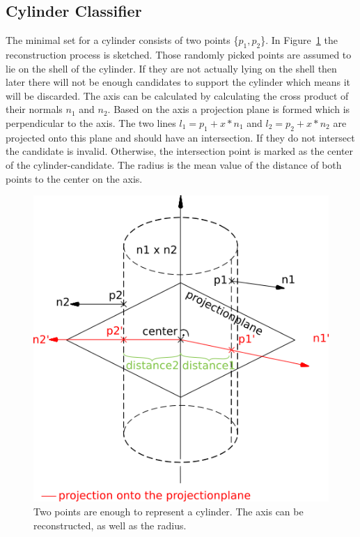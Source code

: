 \documentclass[../ClassicThesis.tex]{subfiles}
\begin{document}
\subsection{Cylinder Classifier}
The minimal set for a cylinder consists of two points \{$p_1, p_2$\}. In Figure~\ref{fig:cylinder} the reconstruction process is sketched. Those randomly picked points are assumed to lie on the shell of the cylinder. If they are not actually lying on the shell then later there will not be enough candidates to support the cylinder which means it will be discarded. The axis can be calculated by calculating the cross product of their normals $n_1$ and $n_2$. Based on the axis a projection plane is formed which is perpendicular to the axis. The two lines $l_1 = p_1 + x*n_1$ and $l_2 = p_2 + x*n_2$ are projected onto this plane and should have an intersection. If they do not intersect the candidate is invalid. Otherwise, the intersection point is marked as the center of the cylinder-candidate. The radius is the mean value of the distance of both points to the center on the axis.
\begin{figure}[!ht]
    \centering
    \includegraphics[width=\columnwidth]{Images/cylinder.png}
    \caption{Two points are enough to represent a cylinder. The axis can be reconstructed, as well as the radius.}
    \label{fig:cylinder}
\end{figure}
\end{document}
